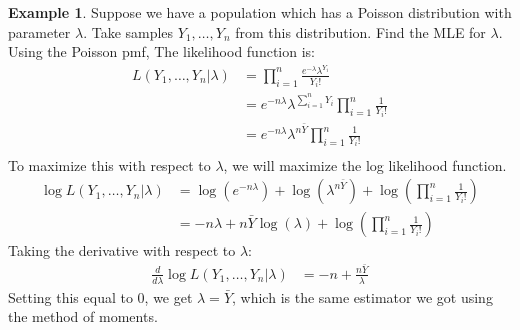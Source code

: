 \documentclass[12pt]{article}
\theoremstyle{definition}
\newtheorem*{example}{Example}
\theoremstyle{remark}
\begin{document}
\begin{example}Suppose we have a population which has a Poisson distribution with parameter $\lambda$. Take samples $Y_1, \dots, Y_n$ from this distribution. Find the MLE for $\lambda$.\\

Using the Poisson pmf, The likelihood function is:
\begin{align*}
L(Y_1, \dots, Y_n | \lambda) &= \prod_{i=1}^n \frac{e^{-\lambda} \lambda^{Y_i}}{Y_i!} \\
&= e^{-n \lambda} \lambda^{\sum_{i=1}^n Y_i} \prod_{i=1}^n \frac{1}{Y_i!} \\
&= e^{-n \lambda} \lambda^{n \bar{Y}} \prod_{i=1}^n \frac{1}{Y_i!} \\
\end{align*}
To maximize this with respect to $\lambda$, we will maximize the log likelihood function.
\begin{align*}
\log L(Y_1, \dots, Y_n | \lambda) &= \log(e^{-n \lambda}) + \log(\lambda^{n \bar{Y}} ) + \log \left( \prod_{i=1}^n \frac{1}{Y_i!}  \right)\\
&= -n \lambda + n \bar{Y} \log(\lambda) + \log \left( \prod_{i=1}^n \frac{1}{Y_i!} \right)
\end{align*}
Taking the derivative with respect to $\lambda$:
\begin{align*}
\frac{d}{d \lambda} \log L(Y_1, \dots, Y_n | \lambda) &= -n + \frac{ n \bar{Y} }{\lambda}
\end{align*}
Setting this equal to 0, we get $\lambda = \bar{Y}$, which is the same estimator we got using the method of moments.
\end{example}
\end{document}
